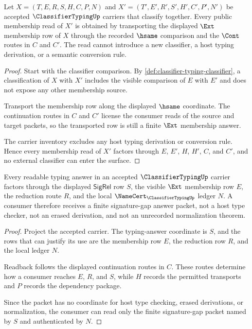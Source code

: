 \begin{theorem}
\label{thm:classifier-typing-membership-stability}
Let $X=(T,E,R,S,H,C,P,N)$ and $X'=(T',E',R',S',H',C',P',N')$ be accepted $\ClassifierTypingUp$ carriers that classify together. Every public membership read of $X'$ is obtained by transporting the displayed $\Ext$ membership row of $X$ through the recorded $\hsame$ comparison and the $\Cont$ routes in $C$ and $C'$. The read cannot introduce a new classifier, a host typing derivation, or a semantic conversion rule.
\end{theorem}
\begin{proof}
Start with the classifier comparison. By \autoref{def:classifier-typing-classifier}, a classification of $X$ with $X'$ includes the visible comparison of $E$ with $E'$ and does not expose any other membership source.

Transport the membership row along the displayed $\hsame$ coordinate. The continuation routes in $C$ and $C'$ license the consumer reads of the source and target packets, so the transported row is still a finite $\Ext$ membership answer.

The carrier inventory excludes any host typing derivation or conversion rule. Hence every membership read of $X'$ factors through $E$, $E'$, $H$, $H'$, $C$, and $C'$, and no external classifier can enter the surface.
\end{proof}

\begin{theorem}
\label{thm:classifier-typing-signature-gap-readback}
Every readable typing answer in an accepted $\ClassifierTypingUp$ carrier factors through the displayed $\mathsf{SigRel}$ row $S$, the visible $\Ext$ membership row $E$, the reduction route $R$, and the local $\NameCert_{\ClassifierTypingUp}$ ledger $N$. A consumer therefore receives a finite signature-gap answer packet, not a host type checker, not an erased derivation, and not an unrecorded normalization theorem.
\end{theorem}
\begin{proof}
Project the accepted carrier. The typing-answer coordinate is $S$, and the rows that can justify its use are the membership row $E$, the reduction row $R$, and the local ledger $N$.

Readback follows the displayed continuation routes in $C$. These routes determine how a consumer reaches $E$, $R$, and $S$, while $H$ records the permitted transports and $P$ records the dependency package.

Since the packet has no coordinate for host type checking, erased derivations, or normalization, the consumer can read only the finite signature-gap packet named by $S$ and authenticated by $N$.
\end{proof}

